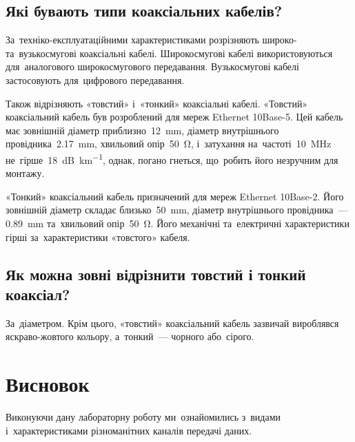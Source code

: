 \documentclass[
	a4paper,
	oneside,
	BCOR = 10mm,
	DIV = 12,
	12pt,
	headings = normal,
]{scrartcl}
\begin{document}
		\subsection{Які бувають типи коаксіальних кабелів?}
			За~техніко-експлуатаційними характеристиками розрізняють широко- та~вузькосмугові коаксіальні кабелі. Широкосмугові кабелі використовуються для~аналогового широкосмугового передавання. Вузькосмугові кабелі застосовують для~цифрового передавання.

			Також відрізняють «товстий» і~«тонкий» коаксіальні кабелі. «Товстий» коаксіальний кабель був розроблений для мереж \textenglish{Ethernet 10Base-5}. Цей кабель має зовнішній діаметр приблизно~\SI{12}{\milli\meter}, діаметр внутрішнього провідника~\SI{2.17}{\milli\meter}, хвильовий опір~\SI{50}{\ohm}, і~затухання на~частоті~\SI{10}{\mega\hertz} не~гірше~\SI{18}{\deci\bel\per\kilo\meter}, однак, погано гнеться, що~робить його незручним для монтажу.

			«Тонкий» коаксіальний кабель призначений для мереж \textenglish{Ethernet 10Base-2}. Його зовнішній діаметр складає близько~\SI{50}{\milli\meter}, діаметр внутрішнього провідника~— \SI{0.89}{\milli\meter} та~хвильовий опір~\SI{50}{\ohm}. Його механічні та~електричні характеристики гірші за~характеристики «товстого» кабеля.

		\subsection{Як можна зовні відрізнити товстий і тонкий коаксіал?}
			За~діаметром. Крім цього, «товстий» коаксіальний кабель зазвичай вироблявся яскраво-жовтого кольору, а~тонкий~— чорного або~сірого.

	\section{Висновок}
		Виконуючи дану лабораторну роботу ми~ознайомились з~видами і~характеристиками різноманітних каналів передачі даних.
\end{document}
